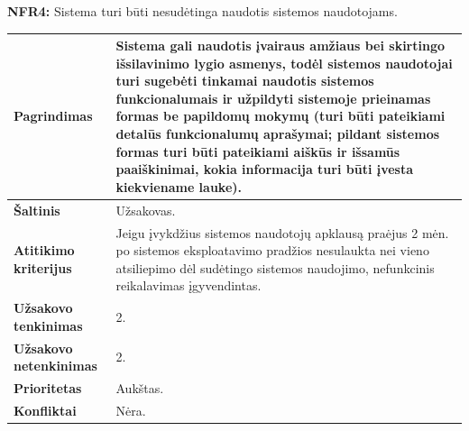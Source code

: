 \documentclass[12pt]{article}
\begin{document}
\noindent \textbf{NFR4:} Sistema turi būti nesudėtinga naudotis sistemos
naudotojams.
\label{sec:NFR4}
\begin{table}[htb!]
    \captionsetup{justification=centering}
    \vskip -10pt
    \begin{tabular}{|m{4.9cm}|m{11cm}|}
        \hline
        \raggedleft \textbf{\cellcolor{deepchampagne}Pagrindimas} &
        Sistema gali naudotis įvairaus amžiaus bei skirtingo išsilavinimo lygio
        asmenys, todėl sistemos naudotojai turi sugebėti tinkamai naudotis
        sistemos funkcionalumais ir užpildyti sistemoje prieinamas formas be
        papildomų mokymų (turi būti pateikiami detalūs funkcionalumų aprašymai;
        pildant sistemos formas turi būti pateikiami aiškūs ir išsamūs
        paaiškinimai, kokia informacija turi būti įvesta kiekviename lauke). \\
        \hline
        \raggedleft \textbf{\cellcolor{deepchampagne}Šaltinis} & Užsakovas. \\
        \hline
        \raggedleft \textbf{\cellcolor{deepchampagne}Atitikimo kriterijus} & 
        Jeigu įvykdžius sistemos naudotojų apklausą praėjus 2 mėn. po sistemos
        eksploatavimo pradžios nesulaukta nei vieno atsiliepimo dėl sudėtingo
        sistemos naudojimo, nefunkcinis reikalavimas įgyvendintas. \\
        \hline
        \raggedleft \textbf{\cellcolor{deepchampagne}Užsakovo tenkinimas} & 2. \\
        \hline
        \raggedleft \textbf{\cellcolor{deepchampagne}Užsakovo netenkinimas} & 2. \\
        \hline
        \raggedleft \textbf{\cellcolor{deepchampagne}Prioritetas} & Aukštas. \\
        \hline
        \raggedleft \textbf{\cellcolor{deepchampagne}Konfliktai} & Nėra. \\
        \hline
    \end{tabular}
\end{table}
\end{document}
